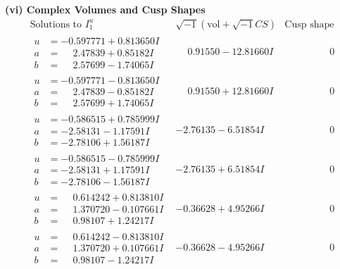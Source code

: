 \documentclass[1p]{elsarticle_modified}
\theoremstyle{definition}
\newcommand{\I}{\sqrt{-1}}
\begin{document}
\newpage\flushleft \textbf{(vi) Complex Volumes and Cusp Shapes}
$$\begin{array}{c|c|c}  
\text{Solutions to }I^u_{1}& \I (\text{vol} + \sqrt{-1}CS) & \text{Cusp shape}\\
 \hline 
\begin{aligned}
u &= -0.597771 + 0.813650 I \\
a &= \phantom{-}2.47839 + 0.85182 I \\
b &= \phantom{-}2.57699 - 1.74065 I\end{aligned}
 & \phantom{-}0.91550 - 12.81660 I & \phantom{-0.000000 } 0 \\ \hline\begin{aligned}
u &= -0.597771 - 0.813650 I \\
a &= \phantom{-}2.47839 - 0.85182 I \\
b &= \phantom{-}2.57699 + 1.74065 I\end{aligned}
 & \phantom{-}0.91550 + 12.81660 I & \phantom{-0.000000 } 0 \\ \hline\begin{aligned}
u &= -0.586515 + 0.785999 I \\
a &= -2.58131 - 1.17591 I \\
b &= -2.78106 + 1.56187 I\end{aligned}
 & -2.76135 - 6.51854 I & \phantom{-0.000000 } 0 \\ \hline\begin{aligned}
u &= -0.586515 - 0.785999 I \\
a &= -2.58131 + 1.17591 I \\
b &= -2.78106 - 1.56187 I\end{aligned}
 & -2.76135 + 6.51854 I & \phantom{-0.000000 } 0 \\ \hline\begin{aligned}
u &= \phantom{-}0.614242 + 0.813810 I \\
a &= \phantom{-}1.370720 - 0.107661 I \\
b &= \phantom{-}0.98107 + 1.24217 I\end{aligned}
 & -0.36628 + 4.95266 I & \phantom{-0.000000 } 0 \\ \hline\begin{aligned}
u &= \phantom{-}0.614242 - 0.813810 I \\
a &= \phantom{-}1.370720 + 0.107661 I \\
b &= \phantom{-}0.98107 - 1.24217 I\end{aligned}
 & -0.36628 - 4.95266 I & \phantom{-0.000000 } 0 \\ \hline\begin{aligned}

\end{aligned}
\end{array}$$
\end{document}
